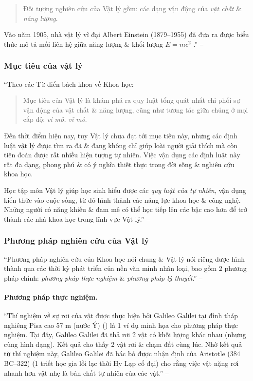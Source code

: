\documentclass[oneside]{book}
\numberwithin{equation}{section}
\begin{document}
\begin{quotation}
	Đối tượng nghiên cứu của Vật lý gồm: các dạng vận động của \textit{vật chất} \& \textit{năng lượng}.
\end{quotation}
Vào năm 1905, nhà vật lý vĩ đại Albert Einstein (1879--1955) đã đưa ra được biểu thức mô tả mối liên hệ giữa năng lượng \& khối lượng $E = mc^2$ \cite[Hình 1.1, p. 5]{SGK_Vat_Ly_10_Chan_Troi_Sang_Tao}.'' -- \cite[p. 5]{SGK_Vat_Ly_10_Chan_Troi_Sang_Tao}

\subsubsection{Mục tiêu của vật lý}
``Theo các Từ điển bách khoa về Khoa học:

\begin{quotation}
	Mục tiêu của Vật lý là khám phá ra quy luật tổng quát nhất chi phối sự vận động của vật chất \& năng lượng, cũng như tương tác giữa chúng ở mọi cấp độ: \textit{vi mô, vĩ mô}.
\end{quotation}
Đến thời điểm hiện nay, tuy Vật lý chưa đạt tới mục tiêu này, nhưng các định luật vật lý được tìm ra đã \& đang không chỉ giúp loài người giải thích mà còn tiên đoán được rất nhiều hiện tượng tự nhiên. Việc vận dụng các định luật này rất đa dạng, phong phú \& có ý nghĩa thiết thực trong đời sống \& nghiên cứu khoa học.

Học tập môn Vật lý giúp học sinh hiểu được các \textit{quy luật của tự nhiên}, vận dụng kiến thức vào cuộc sống, từ đó hình thành các năng lực khoa học \& công nghệ. Những người có năng khiếu \& đam mê có thể học tiếp lên các bậc cao hơn để trở thành các nhà khoa học trong lĩnh vực Vật lý.'' -- \cite[p. 6]{SGK_Vat_Ly_10_Chan_Troi_Sang_Tao}

\subsubsection{Phương pháp nghiên cứu của Vật lý}
``Phương pháp nghiên cứu của Khoa học nói chung \& Vật lý nói riêng được hình thành qua các thời kỳ phát triển của nền văn minh nhân loại, bao gồm 2 phương pháp chính: \textit{phương pháp thực nghiệm} \& \textit{phương pháp lý thuyết}.'' -- \cite[p. 6]{SGK_Vat_Ly_10_Chan_Troi_Sang_Tao}

\paragraph{Phương pháp thực nghiệm.} ``Thí nghiệm về sự rơi của vật được thực hiện bởi Galileo Galilei tại đỉnh tháp nghiêng Pisa cao 57 m (nước Ý) (\cite[Hình 1.3: \textsf{Galileo Galilei (1564--1642) \& tháp nghiêng Pisa.}, p. 6]{SGK_Vat_Ly_10_Chan_Troi_Sang_Tao}) là 1 ví dụ minh họa cho phương pháp thực nghiệm. Tại đây, Galileo Galilei đã thả rơi 2 vật có khối lượng khác nhau (nhưng cùng hình dạng). Kết quả cho thấy 2 vật rơi \& chạm đất cùng lúc. Nhờ kết quả từ thí nghiệm này, Galileo Galilei đã bác bỏ được nhận định của Aristotle (384 BC--322) (1 triết học gia lỗi lạc thời Hy Lạp cổ đại) cho rằng việc vật nặng rơi nhanh hơn vật nhẹ là bản chất tự nhiên của các vật.'' -- \cite[pp. 6--7]{SGK_Vat_Ly_10_Chan_Troi_Sang_Tao}
\end{document}

